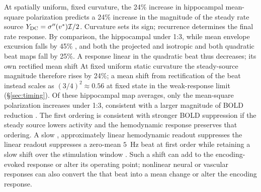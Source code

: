 \documentclass[11pt,a4paper]{article}
\newcommand{\Sig}{\sigma}
\providecommand{\DIFaddtex}[1]{{\protect\color{blue} \sf #1}} %
\providecommand{\DIFdeltex}[1]{{\protect\color{red} \scriptsize #1}} %
\providecommand{\DIFaddbegin}{} %
\providecommand{\DIFaddend}{} %
\providecommand{\DIFdelbegin}{} %
\providecommand{\DIFdelend}{} %
\providecommand{\DIFadd}[1]{\texorpdfstring{\DIFaddtex{#1}}{#1}} %
\providecommand{\DIFdel}[1]{\texorpdfstring{\DIFdeltex{#1}}{}} %
\begin{document}

\DIFdel{At spatially uniform, fixed curvature, the 24\% increase in hippocampal
mean-square polarization predicts a 24\% increase in the magnitude of the
steady rate source $Y_{\rm DC}=\Sig''(v^*)\mathcal I/2$. Curvature sets
its sign; recurrence determines the final rate response. By comparison, the hippocampal }\DIFdelend \DIFaddbegin \DIFadd{under 1:3, while }\DIFaddend mean
envelope excursion falls by 45\% \DIFdelbegin \DIFdel{, and both the projected and isotropic }\DIFdelend \DIFaddbegin \DIFadd{and both }\DIFaddend quadratic beat maps fall by 25\%.
\DIFdelbegin \DIFdel{A response linear in the quadratic beat thus decreases; its own rectified
mean shift }\DIFdelend \DIFaddbegin \DIFadd{At fixed uniform static curvature the steady-source magnitude therefore rises
by 24\%; a mean shift from rectification of the beat instead }\DIFaddend scales as
$(3/4)^2\approx0.56$ \DIFdelbegin \DIFdel{at fixed state }\DIFdelend in the weak-response limit\DIFdelbegin \DIFdel{(\S\ref{sec:timing}). Of these hippocampal map averages, only the
mean-square polarization increases under 1:3, consistent with a larger
magnitude of BOLD reduction }\DIFdelend \DIFaddbegin \DIFadd{. The first ordering is
consistent with stronger BOLD suppression }\DIFaddend if the steady source lowers activity
and the hemodynamic response preserves that ordering. A slow \DIFdelbegin \DIFdel{, approximately linear hemodynamic readout
suppresses the }\DIFdelend \DIFaddbegin \DIFadd{linear readout
suppresses a }\DIFaddend zero-mean $5$~Hz beat \DIFdelbegin \DIFdel{at first order }\DIFdelend while retaining a \DIFdelbegin \DIFdel{slow }\DIFdelend shift over the stimulation
window\DIFdelbegin \DIFdel{. Such a shift can add to
the encoding-evoked response or alter its operating point}\DIFdelend ; nonlinear neural or vascular responses can also convert \DIFdelbegin \DIFdel{the }\DIFdelend \DIFaddbegin \DIFadd{that }\DIFaddend beat into
a mean change \DIFaddbegin \DIFadd{or alter the encoding response}\DIFaddend .
\end{document}
